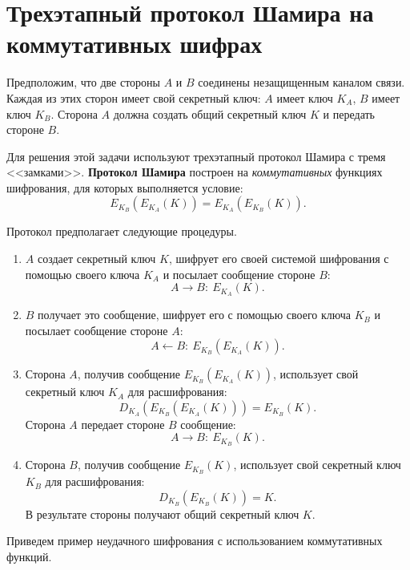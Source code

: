 \section[Трехэтапный протокол Шамира]{Трехэтапный протокол Шамира на коммутативных шифрах}

Предположим, что две стороны $A$ и $B$ соединены незащищенным каналом связи. Каждая из этих сторон имеет свой секретный ключ: $A$ имеет ключ $K_A$, $B$ имеет ключ $K_B$. Сторона $A$ должна создать общий секретный ключ $K$ и передать стороне $B$.

Для решения этой задачи используют трехэтапный протокол Шамира  с тремя <<замками>>. \textbf{Протокол Шамира} построен на  \emph{коммутативных} функциях шифрования, для которых выполняется условие:
    \[ E_{K_{B}} (E_{K_{A}}(K))=E_{K_{A}} (E_{K_{B}}(K)). \]

Протокол предполагает следующие процедуры.
\begin{enumerate}
    \item $A$ создает секретный ключ $K$, шифрует его своей системой шифрования с помощью своего ключа $K_A$ и посылает сообщение стороне $B$:
        \[ A \rightarrow B: ~ E_{K_A}(K). \]
    \item $B$ получает это сообщение, шифрует его с помощью своего ключа $K_B$ и посылает сообщение стороне $A$:
        \[ A \leftarrow B: ~ E_{K_B}( E_{K_A}( K)). \]
    \item Сторона $A$, получив сообщение $E_{K_B}(E_{K_A}(K))$, использует  свой секретный ключ $K_A$ для расшифрования:
            \[ D_{K_A}(E_{K_B} (E_{K_A}(K))) = E_{K_B}(K). \]
        Сторона $A$ передает стороне $B$ сообщение:
        \[ A \rightarrow B: ~ E_{K_B}(K). \]
    \item Сторона $B$, получив сообщение $E_{K_B}(K)$, использует свой секретный ключ $K_B$ для расшифрования:
            \[ D_{K_B}(E_{K_B}(K)) = K. \]
        В результате стороны получают общий секретный ключ $K$.
\end{enumerate}

Приведем пример неудачного шифрования с использованием коммутативных функций.

